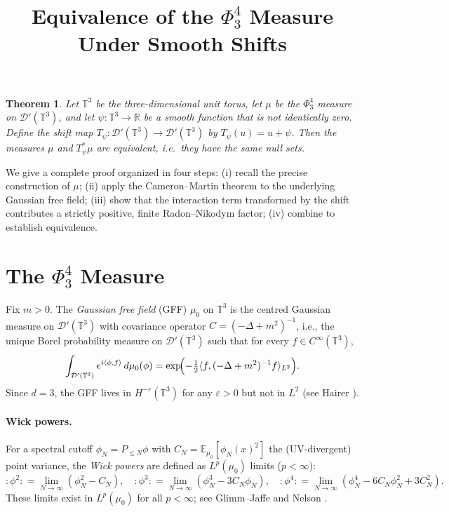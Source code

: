 \documentclass[12pt]{article}
\title{Equivalence of the $\Phi^4_3$ Measure Under Smooth Shifts}
\author{}
\date{}
\newtheorem{theorem}{Theorem}
\theoremstyle{definition}
\begin{document}
\maketitle

\begin{theorem}
Let $\mathbb{T}^3$ be the three-dimensional unit torus, let $\mu$ be the $\Phi^4_3$ measure on
$\mathcal{D}'(\mathbb{T}^3)$, and let $\psi \colon \mathbb{T}^3 \to \mathbb{R}$ be a smooth
function that is not identically zero. Define the shift map
$T_\psi \colon \mathcal{D}'(\mathbb{T}^3) \to \mathcal{D}'(\mathbb{T}^3)$ by $T_\psi(u) = u + \psi$.
Then the measures $\mu$ and $T_\psi^*\mu$ are equivalent, i.e.\ they have the same null sets.
\end{theorem}

We give a complete proof organized in four steps: (i) recall the precise construction of $\mu$;
(ii) apply the Cameron--Martin theorem to the underlying Gaussian free field; (iii) show that the
interaction term transformed by the shift contributes a strictly positive, finite Radon--Nikodym
factor; (iv) combine to establish equivalence.

\section{The $\Phi^4_3$ Measure}

Fix $m > 0$. The \emph{Gaussian free field} (GFF) $\mu_0$ on $\mathbb{T}^3$ is the centred Gaussian
measure on $\mathcal{D}'(\mathbb{T}^3)$ with covariance operator $C = (-\Delta + m^2)^{-1}$, i.e.,
the unique Borel probability measure on $\mathcal{D}'(\mathbb{T}^3)$ such that for every
$f \in C^\infty(\mathbb{T}^3)$,
\[
  \int_{\mathcal{D}'(\mathbb{T}^3)} e^{i\langle \phi, f\rangle} \, d\mu_0(\phi)
  = \exp\!\Bigl(-\tfrac{1}{2}\langle f, (-\Delta+m^2)^{-1} f\rangle_{L^2}\Bigr).
\]
Since $d = 3$, the GFF lives in $H^{-\varepsilon}(\mathbb{T}^3)$ for any $\varepsilon > 0$ but
not in $L^2$ (see Hairer \cite{hairer2014theory}).

\paragraph{Wick powers.}
For a spectral cutoff $\phi_N = P_{\leq N}\phi$ with $C_N = \mathbb{E}_{\mu_0}[\phi_N(x)^2]$ the
(UV-divergent) point variance, the \emph{Wick powers} are defined as $L^p(\mu_0)$ limits
($p < \infty$):
\[
  :\!\phi^2\!: = \lim_{N\to\infty}(\phi_N^2 - C_N),\quad
  :\!\phi^3\!: = \lim_{N\to\infty}(\phi_N^3 - 3C_N\phi_N),\quad
  :\!\phi^4\!: = \lim_{N\to\infty}(\phi_N^4 - 6C_N\phi_N^2 + 3C_N^2).
\]
These limits exist in $L^p(\mu_0)$ for all $p < \infty$; see Glimm--Jaffe \cite{glimmjaffe} and
Nelson \cite{nelson1973}.
\end{document}
